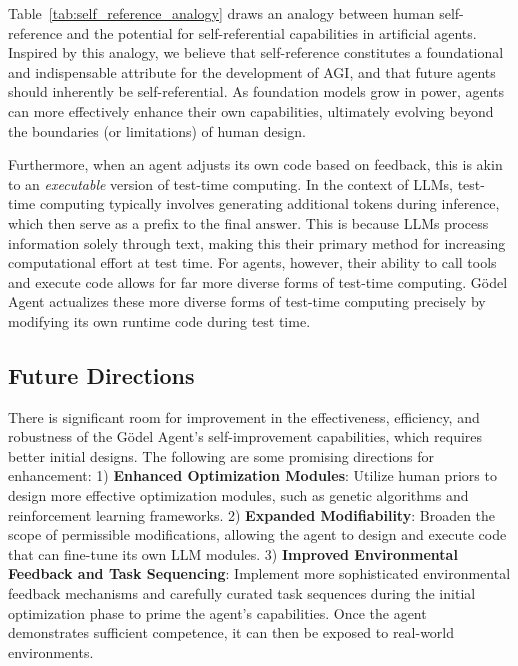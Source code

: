 \documentclass[11pt]{article}
\newcommand{\framework}{Gödel Agent\xspace}
\begin{document}

Table~\ref{tab:self_reference_analogy} draws an analogy between human self-reference and the potential for self-referential capabilities in artificial agents. 
Inspired by this analogy, we believe that self-reference constitutes a foundational and indispensable attribute for the development of AGI, and that future agents should inherently be self-referential.
As foundation models grow in power, agents can more effectively enhance their own capabilities, ultimately evolving beyond the boundaries (or limitations) of human design.

Furthermore, when an agent adjusts its own code based on feedback, this is akin to an \textit{executable} version of test-time computing. In the context of LLMs, test-time computing typically involves generating additional tokens during inference, which then serve as a prefix to the final answer. This is because LLMs process information solely through text, making this their primary method for increasing computational effort at test time. For agents, however, their ability to call tools and execute code allows for far more diverse forms of test-time computing. \framework{} actualizes these more diverse forms of test-time computing precisely by modifying its own runtime code during test time.


\subsection{Future Directions}




There is significant room for improvement in the effectiveness, efficiency, and robustness of the \framework{}'s self-improvement capabilities, which requires better initial designs. The following are some promising directions for enhancement:
1) \textbf{Enhanced Optimization Modules}: Utilize human priors to design more effective optimization modules, such as genetic algorithms and reinforcement learning frameworks.
2) \textbf{Expanded Modifiability}: Broaden the scope of permissible modifications, allowing the agent to design and execute code that can fine-tune its own LLM modules.
3) \textbf{Improved Environmental Feedback and Task Sequencing}: Implement more sophisticated environmental feedback mechanisms and carefully curated task sequences during the initial optimization phase to prime the agent's capabilities. Once the agent demonstrates sufficient competence, it can then be exposed to real-world environments.
\end{document}
